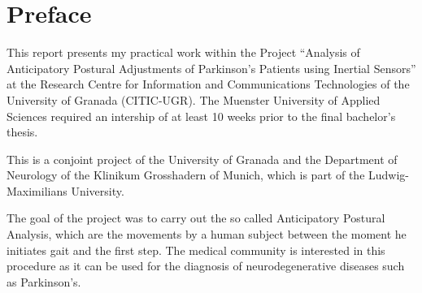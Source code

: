 \chapter*{Preface}

This report presents my practical work within the Project ``Analysis of Anticipatory Postural Adjustments of Parkinson's Patients using Inertial Sensors'' at the Research Centre for Information and Communications Technologies of the University of Granada (CITIC-UGR). The Muenster University of Applied Sciences required an intership of at least 10 weeks prior to the final bachelor's thesis.

This is a conjoint project of the University of Granada and the Department of Neurology of the Klinikum Grosshadern of Munich, which is part of the Ludwig-Maximilians University.

The goal of the project was to carry out the so called Anticipatory Postural Analysis, which are the movements by a human subject between the moment he initiates gait and the first step. The medical community is interested in this procedure as it can be used for the diagnosis of neurodegenerative diseases such as Parkinson's.